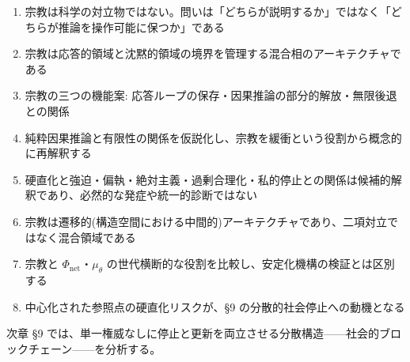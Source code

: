 \begin{enumerate}
\item 宗教は科学の対立物ではない。問いは「どちらが説明するか」ではなく「どちらが推論を操作可能に保つか」である
\item 宗教は応答的領域と沈黙的領域の境界を管理する混合相のアーキテクチャである
\item 宗教の三つの機能案: 応答ループの保存・因果推論の部分的解放・無限後退との関係
\item 純粋因果推論と有限性の関係を仮説化し、宗教を緩衝という役割から概念的に再解釈する
\item 硬直化と強迫・偏執・絶対主義・過剰合理化・私的停止との関係は候補的解釈であり、必然的な発症や統一的診断ではない
\item 宗教は遷移的(構造空間における中間的)アーキテクチャであり、二項対立ではなく混合領域である
\item 宗教と $\Phi_{\text{net}}$・$\mu_\theta$ の世代横断的な役割を比較し、安定化機構の検証とは区別する
\item 中心化された参照点の硬直化リスクが、\S{}9 の分散的社会停止への動機となる
\end{enumerate}


次章 \S{}9 では、単一権威なしに停止と更新を両立させる分散構造——社会的ブロックチェーン——を分析する。

\bigskip
